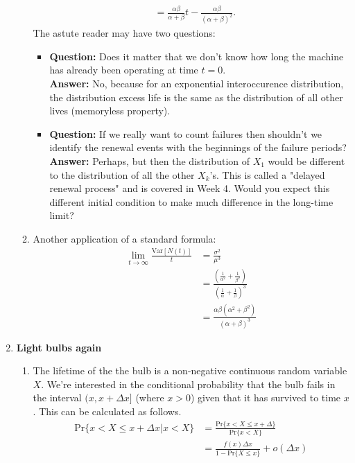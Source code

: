 \documentclass[11pt,a4paper]{article}
\begin{document}
\begin{enumerate}
\begin{enumerate}
\begin{align*}
        &= \frac{\alpha \beta}{\alpha + \beta}t - \frac{\alpha\beta}{(\alpha + \beta)^2}.
      \end{align*}
      The astute reader may have two questions:
      \begin{itemize}
        \item \textbf{Question:} Does it matter that we don't know how long the machine has already been operating at time $t = 0$.\\
        \textbf{Answer:} No, because for an exponential interoccurence distribution, the distribution excess life is the same as the distribution of all other lives (memoryless property).
        \item \textbf{Question:} If we really want to count failures then shouldn't we identify the renewal events with the beginnings of the failure periods?\\
        \textbf{Answer:} Perhaps, but then the distribution of $X_1$ would be different to the distribution of all the other $X_k$'s. This is called a "delayed renewal process" and is covered in Week 4. Would you expect this different initial condition to make much difference in the long-time limit?
      \end{itemize}
      \item Another application of a standard formula:
      \begin{align*}
        \lim_{t \to \infty}\frac{\text{Var}[N(t)]}{t}
        &= \frac{\sigma^2}{\mu^3}\\
        &= \frac{\left(\frac{1}{\alpha^2} + \frac{1}{\beta^2}\right)}{\left(\frac{1}{\alpha} + \frac{1}{\beta}\right)^3}\\
        &= \frac{\alpha\beta(\alpha^2 + \beta^2)}{(\alpha + \beta)^3}
      \end{align*}
    \end{enumerate}
    \item \textbf{Light bulbs again}
    \begin{enumerate}
      \item The lifetime of the the bulb is a non-negative continuous random variable $X$. We're interested in the conditional probability that the bulb fails in the interval $(x, x + \Delta x]$ (where $x > 0$) given that it has survived to time $x$. This can be calculated as follows.
      \begin{align*}
        \text{Pr}\{x < X \leq x + \Delta x | x<X\}
        &= \frac{\text{Pr}\{x < X \leq x + \Delta \}}{\text{Pr}\{x < X\}}\\
        &= \frac{f(x)\Delta x}{1 - \text{Pr}\{X \leq x\}} + o(\Delta x)\\

\end{align*}
\end{enumerate}
\end{enumerate}
\end{document}
